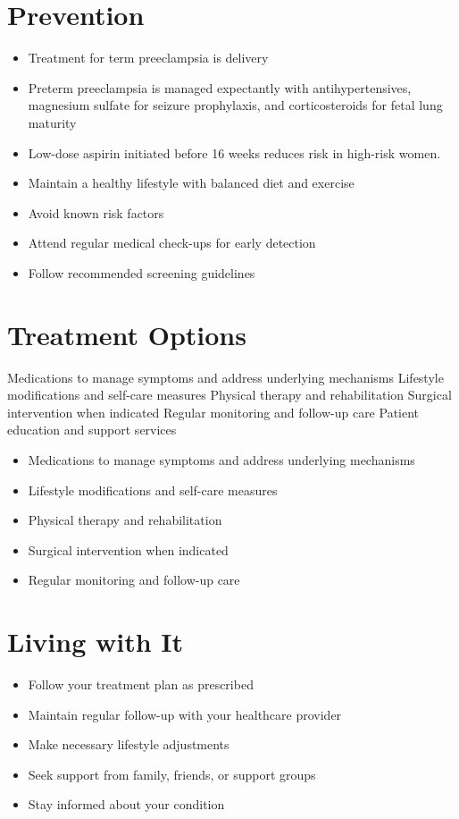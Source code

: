 \section{Prevention}
\begin{itemize}[noitemsep]
  \item Treatment for term preeclampsia is delivery
  \item Preterm preeclampsia is managed expectantly with antihypertensives, magnesium sulfate for seizure prophylaxis, and corticosteroids for fetal lung maturity
  \item Low-dose aspirin initiated before 16 weeks reduces risk in high-risk women.
  \item Maintain a healthy lifestyle with balanced diet and exercise
  \item Avoid known risk factors
  \item Attend regular medical check-ups for early detection
  \item Follow recommended screening guidelines
\end{itemize}
\section{Treatment Options}
Medications to manage symptoms and address underlying mechanisms Lifestyle modifications and self-care measures Physical therapy and rehabilitation Surgical intervention when indicated Regular monitoring and follow-up care Patient education and support services

\begin{itemize}[noitemsep]
  \item Medications to manage symptoms and address underlying mechanisms
  \item Lifestyle modifications and self-care measures
  \item Physical therapy and rehabilitation
  \item Surgical intervention when indicated
  \item Regular monitoring and follow-up care
\end{itemize}
\section{Living with It}
\begin{itemize}[noitemsep]
  \item Follow your treatment plan as prescribed
  \item Maintain regular follow-up with your healthcare provider
  \item Make necessary lifestyle adjustments
  \item Seek support from family, friends, or support groups
  \item Stay informed about your condition
\end{itemize}
